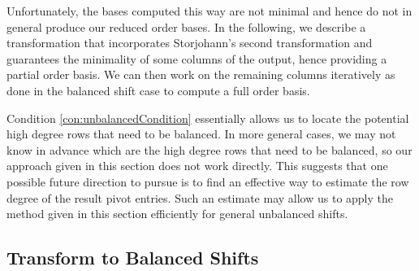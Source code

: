 Unfortunately, the bases computed this way are not minimal and hence
do not in general produce our reduced order bases. In the following,
we describe a transformation that incorporates Storjohann's second
transformation and guarantees the minimality of some columns of the
output, hence providing a partial order basis. We can then work on
the remaining columns iteratively as done in the balanced shift case
to compute a full order basis.

Condition \eqref{con:unbalancedCondition} essentially allows us to
locate the potential high degree rows that need to be balanced. In
more general cases, we may not know in advance which are the high
degree rows that need to be balanced, so our approach given in this
section does not work directly. This suggests that one possible future
direction to pursue is to find an effective way to estimate the row
degree of the result pivot entries. Such an estimate may allow us
to apply the method given in this section efficiently for general
unbalanced shifts. 


\subsection{Transform to Balanced Shifts}

